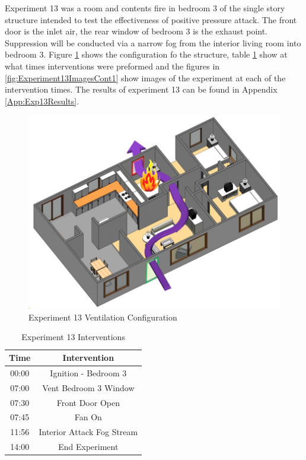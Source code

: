 \documentclass{article}
\begin{document}
Experiment 13 was a room and contents fire in bedroom 3 of the single story structure intended to test the effectiveness of positive pressure attack. The front door is the inlet air, the rear window of bedroom 3 is the exhaust point. Suppression will be conducted via a narrow fog from the interior living room into bedroom 3. Figure \ref{fig:Exp13VentConfig} shows the configuration fo the structure, table \ref{Table:Exp13Interventions} show at what times interventions were preformed and the figures in \ref{fig:Experiment13ImagesCont1} show images of the experiment at each of the intervention times. The results of experiment 13 can be found in Appendix \ref{App:Exp13Results}.

\begin{figure}[h!]
	\centering
	\includegraphics[width=5in]{0_Images/FireExperiments/Single_Story/Experiment_13.jpg}
	\caption{Experiment 13 Ventilation Configuration}
	\label{fig:Exp13VentConfig}
\end{figure}

\begin{table}[H]
	\centering
	\caption{Experiment 13 Interventions}
	\begin{tabular}{|c|c|} 
		\hline
		Time & Intervention \\ \hline \hline
		00:00 & Ignition - Bedroom 3\\ \hline
		07:00 & Vent Bedroom 3 Window \\ \hline
		07:30 & Front Door Open \\ \hline
		07:45 & Fan On \\ \hline
		11:56 & Interior Attack Fog Stream \\ \hline
		14:00 & End Experiment \\ \hline
	\end{tabular}
	\label{Table:Exp13Interventions}
\end{table}
\end{document}
